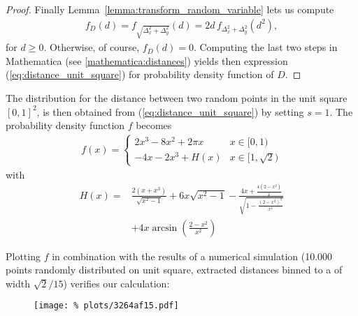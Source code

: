 \begin{proof}
  Finally Lemma~\ref{lemma:transform_random_variable} lets us compute
  \begin{align*}%
  f_D(d) = f_{\sqrt{\Delta_x^2 + \Delta_y^2}}(d) = 2d\, f_{\Delta_x^2 +
    \Delta_y^2}(d^2),
  \end{align*}
  for $d \geq 0$. Otherwise, of course, $f_D(d) = 0$. Computing the
  last two steps
  in  Mathematica (see \autoref{mathematica:distances})
  yields then expression (\ref{eq:distance_unit_square}) for
  probability density function of $D$. 
\end{proof}

The distribution for the distance between two random points in the
unit square $[0,1]^2$, is then obtained from
(\ref{eq:distance_unit_square}) by setting $s=1$. The probability
density function $f$ becomes
  \begin{align}\label{eq:dist_pdf}
    f(x) = \begin{cases} 2x^3 -8x^2 + 2\pi x & x \in [0,1) \\ %
                         - 4x -2x^3 + H(x)   &  x \in [1,\sqrt{2}) %
           \end{cases}
  \end{align}
  with
  \begin{align*}
    H(x) = 
      & \frac{2(x+x^3)}{\sqrt{x^2-1}} +
        6x \sqrt{x^2-1} 
       - \frac{4x + 
          \frac{4 (2 - x^2)}{x}}{\sqrt{1 - \frac{(2 -
            x^2)^2}{x^4}}} \\
      &  + 4 x \operatorname{arcsin}\left(\frac{2 -x^2}{x^2}\right)
  \end{align*}

Plotting $f$ in combination with the results of a numerical simulation
(10.000 points randomly distributed on unit square, extracted
distances binned to a of width $\sqrt{2}/15$) verifies our calculation: 

\begin{figure}[h] \centering
  \texttt{[image: \%
    plots/3264af15.pdf]}%
  \label{fig:distance_distribution}
\end{figure}

